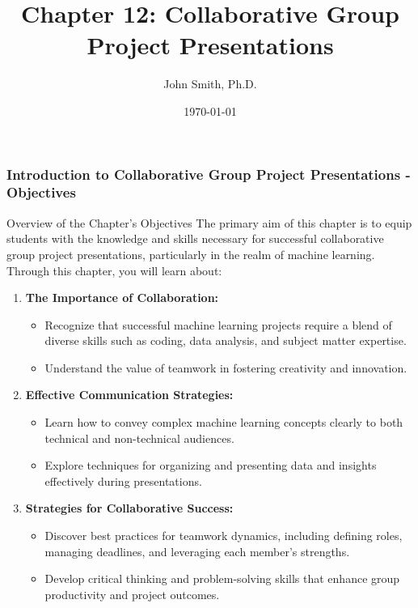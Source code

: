 \documentclass[aspectratio=169]{beamer}
\title[Collaborative Group Project Presentations]{Chapter 12: Collaborative Group Project Presentations}
\author[J. Smith]{John Smith, Ph.D.}
\institute[University Name]{
  Department of Computer Science\\
  University Name\\
  \vspace{0.3cm}
  Email: email@university.edu\\
  Website: www.university.edu
}
\date{\today}
\begin{document}
\frame{\titlepage}

\begin{frame}[fragile]
    \frametitle{Introduction to Collaborative Group Project Presentations - Objectives}
    
    \begin{block}{Overview of the Chapter's Objectives}
        The primary aim of this chapter is to equip students with the knowledge and skills necessary for successful collaborative group project presentations, particularly in the realm of machine learning. Through this chapter, you will learn about:
    \end{block}
    
    \begin{enumerate}
        \item \textbf{The Importance of Collaboration:}
        \begin{itemize}
            \item Recognize that successful machine learning projects require a blend of diverse skills such as coding, data analysis, and subject matter expertise.
            \item Understand the value of teamwork in fostering creativity and innovation.
        \end{itemize}

        \item \textbf{Effective Communication Strategies:}
        \begin{itemize}
            \item Learn how to convey complex machine learning concepts clearly to both technical and non-technical audiences.
            \item Explore techniques for organizing and presenting data and insights effectively during presentations.
        \end{itemize}

        \item \textbf{Strategies for Collaborative Success:}
        \begin{itemize}
            \item Discover best practices for teamwork dynamics, including defining roles, managing deadlines, and leveraging each member’s strengths.
            \item Develop critical thinking and problem-solving skills that enhance group productivity and project outcomes.
        \end{itemize}
    \end{enumerate}
\end{frame}
\end{document}
